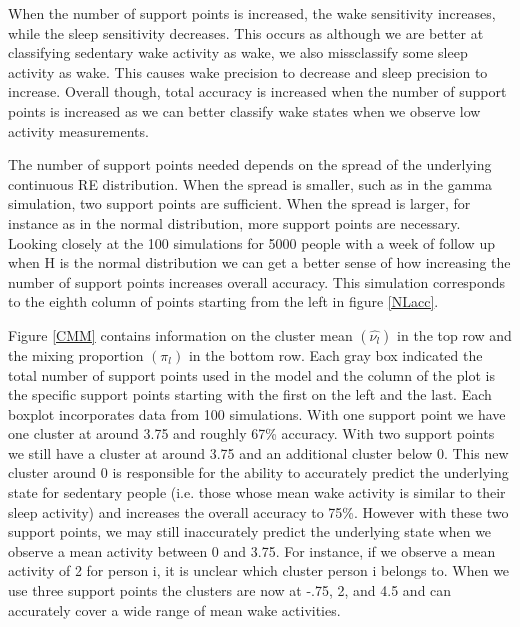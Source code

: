 \documentclass{article}
\begin{document}
When the number of support points is increased, the wake sensitivity 
increases, while the sleep sensitivity decreases. This occurs as 
although we are better at classifying sedentary wake activity as wake, 
we also  missclassify some sleep activity as wake. This causes wake 
precision to decrease and sleep precision to increase. Overall though, 
total accuracy is increased when the number of support points is increased 
as we can better classify wake states when we observe low activity measurements.


The number of support points needed depends on the spread of the 
underlying continuous RE distribution. When the spread is smaller, 
such as in the gamma simulation, two support points are sufficient. 
When the spread is larger, for instance as in the normal distribution, 
more support points are necessary. Looking closely at the 100 
simulations for 5000 people with a week of follow up when H is 
the normal distribution we can get a better sense of how increasing 
the number of support points increases overall accuracy. 
This simulation corresponds to the eighth column of points starting 
from the left in figure \ref{NLacc}. 

Figure \ref{CMM} contains information on the cluster mean 
$(\hat{\nu_l})$ in the top row and the mixing proportion 
$(\pi_l)$ in the bottom row. Each gray box indicated the 
total number of support points used in the model and the 
column of the plot is the specific support points starting 
with the first on the left and the last. Each boxplot 
incorporates data from 100 simulations. With one support point 
we have one cluster at around 3.75 and roughly 67\% accuracy. 
With two support points we still have a cluster at around 3.75 
and an additional cluster below 0. This new cluster around 0 is 
responsible for the ability to accurately predict the underlying 
state for sedentary people (i.e. those whose mean wake activity 
is similar to their sleep activity) and increases the overall 
accuracy to 75\%. However with these two support points, we may 
still inaccurately predict the underlying state when we observe 
a mean activity between 0 and 3.75. For instance, if we observe 
a mean activity of 2 for person i, it is unclear which cluster 
person i belongs to. When we use three support points the clusters 
are now at -.75, 2, and 4.5 and can accurately cover a wide range 
of mean wake activities. 
\end{document}
